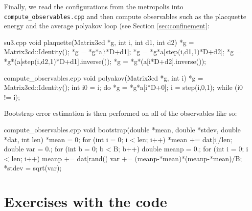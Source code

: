 \documentclass[11pt]{article}
\begin{document}
Finally, we read the configurations from the metropolis into \lstinline{compute_observables.cpp} and then compute observables such as the placquette energy and the average polyakov loop (see Section \ref{sec:confinement}:

\begin{center}
\begin{minipage}{0.72\linewidth}
\begin{code}{su3.cpp}
void plaquette(Matrix3cd *g, int i, int d1, int d2)
{
        *g = Matrix3cd::Identity();
        *g = *g*a[i*D+d1];
        *g = *g*a[step(i,d1,1)*D+d2];
        *g = *g*(a[step(i,d2,1)*D+d1].inverse());
        *g = *g*(a[i*D+d2].inverse());
}
\end{code}
\end{minipage}
\end{center}

\begin{center}
\begin{minipage}{0.55\linewidth}
\begin{code}{compute\_observables.cpp}
void polyakov(Matrix3cd *g, int i)
{
        *g = Matrix3cd::Identity();
        int i0 = i;
        do {
                *g = *g*a[i*D+0];
                i = step(i,0,1);
        } while (i0 != i);
}
\end{code}
\end{minipage}
\end{center}

Bootstrap error estimation is then performed on all of the observables like so:

\begin{center}
\begin{minipage}{0.9\linewidth}
\begin{code}{compute\_observables.cpp}
void bootstrap(double *mean, double *stdev, double *dat, int len)
{
        *mean = 0;
        for (int i = 0; i < len; i++)
                *mean += dat[i]/len;
        double var = 0.;
        for (int b = 0; b < B; b++) {
                double meanp = 0.;
                for (int i = 0; i < len; i++)
                        meanp += dat[rand()%
                var += (meanp-*mean)*(meanp-*mean)/B;
        }
        *stdev = sqrt(var);
}
\end{code}
\end{minipage}
\end{center}

\pagebreak %

\section{Exercises with the code}
\end{document}
